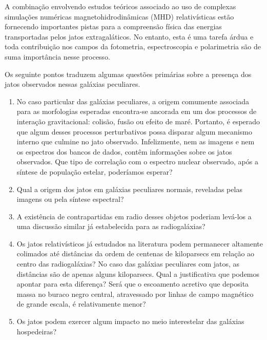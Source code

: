 A combinação envolvendo estudos teóricos \cite{blandford1977electromagnetic,blandford1982hydromagnetic,  begelman1984theory,  punsly1990ergosphere, ferrari1998modeling, meier2001magnetohydrodynamic} associado ao uso de complexas simulações numéricas magnetohidrodinâmicas (MHD) relativísticas \cite{koide2000general, koide2003magnetic, mckinney2004measurement, de2005magnetically, komissarov2005observations, hawley2006magnetically, mckinney2006general, mckinney2007disc, punsly2007three, tchekhovskoy2008simulations} estão fornecendo importantes pistas para a compreensão física das energias transportadas pelos jatos extragaláticos. No entanto, esta é uma tarefa árdua e toda contribuição nos campos da fotometria, espectroscopia e polarimetria são de suma importância nesse processo.

Os seguinte pontos traduzem algumas questões primárias sobre a presença dos jatos observados nessas galáxias peculiares.

\begin{enumerate}
    
    \item No caso particular das galáxias peculiares, a origem comumente associada para as morfologias esperadas encontra-se ancorada em um dos processos de interação gravitacional: colisão, fusão ou efeito de maré. Portanto, é esperado que algum desses processos perturbativos possa disparar algum mecanismo interno que culmine no jato observado. Infelizmente, nem as imagens e nem os espectros dos bancos de dados, contêm informações sobre os jatos observados. Que tipo de correlação com o espectro nuclear observado, após a síntese de população estelar, poderíamos esperar?
    
    \item Qual a origem dos jatos em galáxias peculiares normais, reveladas pelas imagens ou pela síntese espectral?
    
    \item A existência de contrapartidas em radio desses objetos poderiam levá-los a uma discussão similar já estabelecida para as radiogaláxias?

    \item Os jatos relativísticos já estudados na literatura podem permanecer altamente colimados até distâncias da ordem de centenas de kiloparsecs em relação ao centro das radiogaláxias? No caso das galáxias peculiares com jatos, as distâncias são de apenas alguns kiloparsecs. Qual a justificativa que podemos apontar para esta diferença? Será que o escoamento acretivo que deposita massa no buraco negro central, atravessado por linhas de campo magnético de grande escala, é relativamente menor?

    \item Os jatos podem exercer algum impacto no meio interestelar das galáxias hospedeiras?

\end{enumerate}

